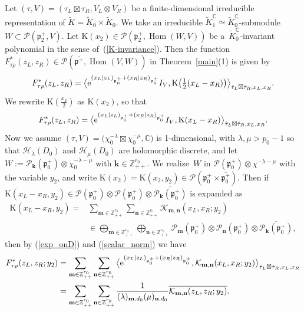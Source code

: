 \documentclass[pdftex]{sigma}
\numberwithin{equation}{section}
\newcommand{\bk}{\mathbf{k}}
\newcommand{\bm}{\mathbf{m}}
\newcommand{\bn}{\mathbf{n}}
\newcommand{\BZ}{\mathbb{Z}}
\newcommand{\BC}{\mathbb{C}}
\newcommand{\fp}{\mathfrak{p}}
\newcommand{\cH}{\mathcal{H}}
\newcommand{\cK}{\mathcal{K}}
\newcommand{\cP}{\mathcal{P}}
\newcommand{\rK}{\mathrm{K}}
\newcommand{\Hom}{\operatorname{Hom}}
\begin{document}
Let $(\tau,V)=(\tau_L\boxtimes\tau_R,V_L\otimes V_R)$ be a finite-dimensional irreducible representation
of $\tilde{K}=\tilde{K}_0\times \tilde{K}_0$.
We take an irreducible $\tilde{K}_1^\BC\simeq\tilde{K}_0^\BC$-submodule $W\subset\cP(\fp^+_2,V)$.
Let $\rK(x_2)\in\cP(\fp^+_2,\allowbreak\Hom(W,V))$ be a~$\tilde{K}^\BC_0$-invariant polynomial in the sense of~(\ref{K-invariance}).
Then the function $F_{\tau\rho}^*(z_L,z_R)\in\cP(\overline{\fp^+},\Hom(V,W))$ in Theorem~\ref{main}(1) is given by
\begin{gather*} F_{\tau\rho}^*(z_L,z_R)=\big\langle {\rm e}^{(x_L|z_L)_{\fp^+_0}+(x_R|z_R)_{\fp^+_0}}I_V,\rK\big(\tfrac{1}{2}(x_L-x_R)\big)
\big\rangle_{\hat{\tau}_L\boxtimes\hat{\tau}_R,x_L,x_R}. \end{gather*}
We rewrite $\rK\left(\frac{x_2}{2}\right)$ as $\rK(x_2)$, so that
\begin{gather*} F_{\tau\rho}^*(z_L,z_R)=\big\langle {\rm e}^{(x_L|z_L)_{\fp^+_0}+(x_R|z_R)_{\fp^+_0}}I_V,\rK(x_L-x_R)
\big\rangle_{\hat{\tau}_L\boxtimes\hat{\tau}_R,x_L,x_R}. \end{gather*}
Now we assume $(\tau,V)=\big(\chi^{-\lambda}_0\boxtimes \chi^{-\mu}_0,\BC\big)$ is 1-dimensional, with $\lambda,\mu>p_0-1$ so that
$\cH_\lambda(D_0)$ and $\cH_\mu(D_0)$ are holomorphic discrete,
and let $W:=\cP_\bk(\fp^+_0)\otimes\chi^{-\lambda-\mu}_0$ with $\bk\in\BZ_{++}^{r_0}$.
We realize~$W$ in $\cP(\fp^+_0)\otimes\chi^{-\lambda-\mu}$ with the variable $y_2$,
and write $\rK(x_2)=\rK(x_2,y_2)\in\cP(\fp^+_0\times\overline{\fp^+_0})$.
Then if $\rK(x_L-x_R,y_2)\in\cP(\fp^+_0)\otimes\cP(\fp^+_0)\otimes\overline{\cP_\bk(\fp^+_0)}$ is expanded as
\begin{align*}
\rK(x_L-x_R,y_2)={} &\sum_{\bm\in\BZ_{++}^{r_0}}\sum_{\bn\in\BZ_{++}^{r_0}}\cK_{\bm,\bn}(x_L,x_R;y_2) \\
&{}\in\bigoplus_{\bm\in\BZ_{++}^{r_0}}\bigoplus_{\bn\in\BZ_{++}^{r_0}}\cP_\bm(\fp^+_0)\otimes\cP_\bn(\fp^+_0)\otimes\overline{\cP_\bk(\fp^+_0)},
\end{align*}
then by (\ref{exp_onD}) and (\ref{scalar_norm}) we have
\begin{align*}
F_{\tau\rho}^*(z_L,z_R;y_2)
&=\sum_{\bm\in\BZ_{++}^{r_0}}\sum_{\bn\in\BZ_{++}^{r_0}}\big\langle {\rm e}^{(x_L|z_L)_{\fp^+_0}+(x_R|z_R)_{\fp^+_0}},
\cK_{\bm,\bn}(x_L,x_R;y_2)\big\rangle_{\hat{\tau}_L\boxtimes\hat{\tau}_R,x_L,x_R}\\
&=\sum_{\bm\in\BZ_{++}^{r_0}}\sum_{\bn\in\BZ_{++}^{r_0}}\frac{1}{(\lambda)_{\bm,d_0}(\mu)_{\bn,d_0}}\overline{\cK_{\bm,\bn}(z_L,z_R;y_2)}.
\end{align*}
\end{document}
